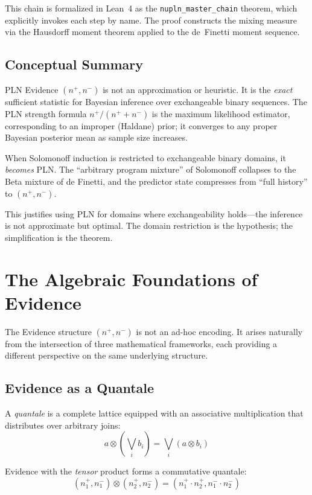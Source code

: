 \documentclass[]{article}
\begin{document}
This chain is formalized in Lean~4 as the \texttt{nupln\_master\_chain}
theorem, which explicitly invokes each step by name.  The proof
constructs the mixing measure via the Hausdorff moment theorem applied
to the de~Finetti moment sequence.

\subsection{Conceptual Summary}

PLN Evidence $(n^+, n^-)$ is not an approximation or heuristic.  It is
the \emph{exact} sufficient statistic for Bayesian inference over
exchangeable binary sequences.  The PLN strength formula $n^+/(n^+ +
n^-)$ is the maximum likelihood estimator, corresponding to an
improper (Haldane) prior; it converges to any proper Bayesian
posterior mean as sample size increases.

When Solomonoff induction is restricted to exchangeable binary
domains, it \emph{becomes} PLN.  The ``arbitrary program mixture'' of
Solomonoff collapses to the Beta mixture of de Finetti, and the
predictor state compresses from ``full history'' to $(n^+, n^-)$.

This justifies using PLN for domains where exchangeability holds---the
inference is not approximate but optimal.  The domain restriction is
the hypothesis; the simplification is the theorem.

\section{The Algebraic Foundations of Evidence}
\label{sec:algebra}

The Evidence structure $(n^+, n^-)$ is not an ad-hoc encoding.  It arises
naturally from the intersection of three mathematical frameworks, each
providing a different perspective on the same underlying structure.

\subsection{Evidence as a Quantale}

A \emph{quantale} is a complete lattice equipped with an associative
multiplication that distributes over arbitrary joins:
$$a \otimes \left(\bigvee_i b_i\right) = \bigvee_i (a \otimes b_i)$$

Evidence with the \emph{tensor} product forms a commutative quantale:
$$(n^+_1, n^-_1) \otimes (n^+_2, n^-_2) = (n^+_1 \cdot n^+_2, n^-_1 \cdot n^-_2)$$
\end{document}
